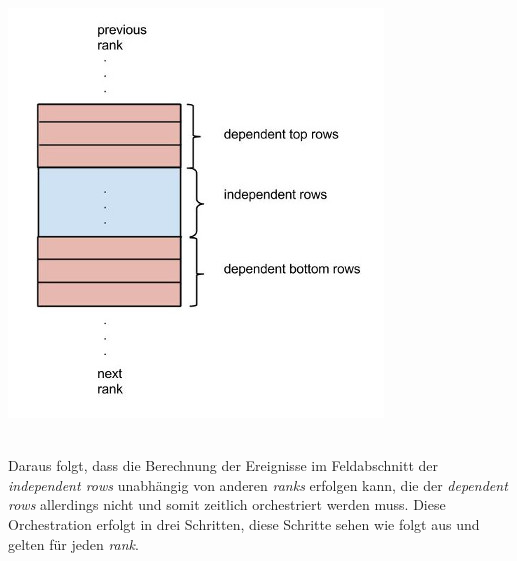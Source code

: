 \begin{center}
	\includegraphics[scale=0.6]{pics/dependent-rows.jpg}
\end{center}

\quad \\
Daraus folgt, dass die Berechnung der Ereignisse im Feldabschnitt der \textit{independent rows} unabhängig von anderen \textit{ranks} erfolgen kann, die der \textit{dependent rows} allerdings nicht und somit zeitlich orchestriert werden muss.
Diese Orchestration erfolgt in drei Schritten, diese Schritte sehen wie folgt aus und gelten für jeden \textit{rank}.

